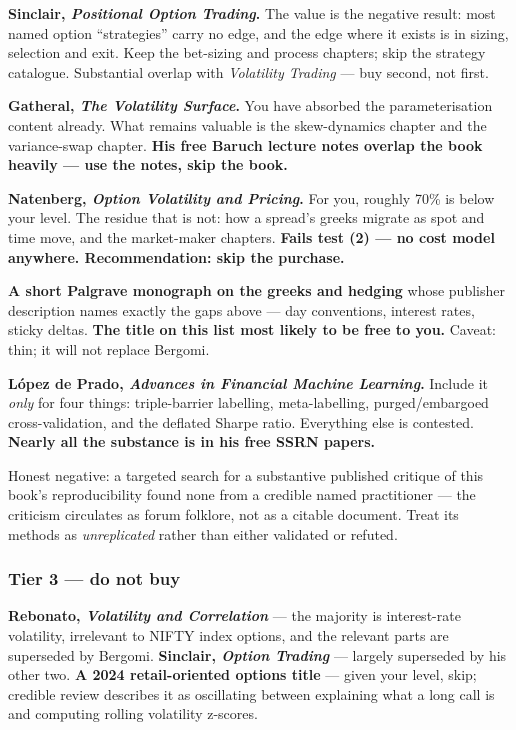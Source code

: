\documentclass[11pt,a4paper]{article}
\newcommand{\srcnote}[1]{{\footnotesize\color{soft}#1\par}}
\begin{document}
\textbf{Sinclair, \emph{Positional Option Trading}.} The value is the negative
result: most named option ``strategies'' carry no edge, and the edge where it
exists is in sizing, selection and exit. Keep the bet-sizing and process chapters;
skip the strategy catalogue. Substantial overlap with \emph{Volatility Trading} ---
buy second, not first.

\textbf{Gatheral, \emph{The Volatility Surface}.} You have absorbed the
parameterisation content already. What remains valuable is the skew-dynamics
chapter and the variance-swap chapter. \textbf{His free Baruch lecture notes
overlap the book heavily --- use the notes, skip the book.}

\textbf{Natenberg, \emph{Option Volatility and Pricing}.} For you, roughly 70\% is
below your level. The residue that is not: how a spread's greeks migrate as spot and
time move, and the market-maker chapters. \textbf{Fails test (2) --- no cost model
anywhere. Recommendation: skip the purchase.}

\textbf{A short Palgrave monograph on the greeks and hedging} whose publisher
description names exactly the gaps above --- day conventions, interest rates,
sticky deltas. \textbf{The title on this list most likely to be free to you.}
Caveat: thin; it will not replace Bergomi.

\textbf{L\'opez de Prado, \emph{Advances in Financial Machine Learning}.} Include
it \emph{only} for four things: triple-barrier labelling, meta-labelling,
purged/embargoed cross-validation, and the deflated Sharpe ratio. Everything else
is contested. \textbf{Nearly all the substance is in his free SSRN papers.}
\srcnote{Honest negative: a targeted search for a substantive published critique of
this book's reproducibility found none from a credible named practitioner --- the
criticism circulates as forum folklore, not as a citable document. Treat its methods
as \emph{unreplicated} rather than either validated or refuted.}

\subsubsection{Tier 3 --- do not buy}

\textbf{Rebonato, \emph{Volatility and Correlation}} --- the majority is
interest-rate volatility, irrelevant to NIFTY index options, and the relevant parts
are superseded by Bergomi. \textbf{Sinclair, \emph{Option Trading}} --- largely
superseded by his other two. \textbf{A 2024 retail-oriented options title} --- given
your level, skip; credible review describes it as oscillating between explaining
what a long call is and computing rolling volatility z-scores.
\end{document}
